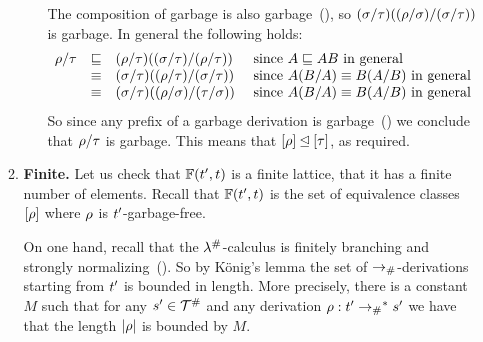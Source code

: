 \begin{enumerate}
\begin{enumerate}
\begin{enumerate}
      The composition of garbage is also garbage~(),
      so $(\sigma/\tau)((\rho/\sigma)/(\sigma/\tau))$ is garbage.
      In general the following holds:
      \[
        \begin{array}{rcll}
        \rho/\tau
        & \sqsubseteq & (\rho/\tau)((\sigma/\tau)/(\rho/\tau))    & \text{ since $A \sqsubseteq AB$ in general} \\
        & \equiv & (\sigma/\tau)((\rho/\tau)/(\sigma/\tau)) & \text{ since $A(B/A) \equiv B(A/B)$ in general} \\
        & \equiv & (\sigma/\tau)((\rho/\sigma)/(\tau/\sigma))   & \text{ since $A(B/A) \equiv B(A/B)$ in general} \\
        \end{array}
      \]
      So since any prefix of a garbage derivation is garbage~()
      we conclude that $\rho/\tau$ is garbage.
      This means that $[\rho] \unlhd [\tau]$, as required.
    \end{enumerate}
  \item {\bf Finite.}
    Let us check that $\mathbb{F}(t', t)$ is a finite lattice, \ie that it has a finite number of elements.
    Recall that $\mathbb{F}(t', t)$ is the set of equivalence classes ${[\rho]}$ where $\rho$
    is $t'$-garbage-free.

    On one hand, recall that the $\lambda^{\mathtt{\#}}$-calculus is finitely branching and strongly normalizing~().
    So by K\"onig's lemma the set of $\mathrel{\to_{\mathtt{\#}}}$-derivations starting from $t'$
    is bounded in length. More precisely, there is a constant $M$ such that
    for any $s' \in \mathcal{T}^{\mathtt{\#}}$ and any derivation $\rho : t' \mathrel{\to_{\mathtt{\#}}}^* s'$
    we have that the length $|\rho|$ is bounded by $M$.


\end{enumerate}
\end{enumerate}
